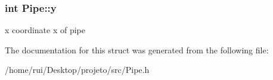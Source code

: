 \subsubsection[{\texorpdfstring{y}{y}}]{\setlength{\rightskip}{0pt plus 5cm}int Pipe\+::y}\hypertarget{structPipe_a250b5faa31ebaa60ca8def2cbf193844}{}\label{structPipe_a250b5faa31ebaa60ca8def2cbf193844}
x coordinate x of pipe 

The documentation for this struct was generated from the following file\+:\begin{DoxyCompactItemize}
\item 
/home/rui/\+Desktop/projeto/src/Pipe.\+h\end{DoxyCompactItemize}
